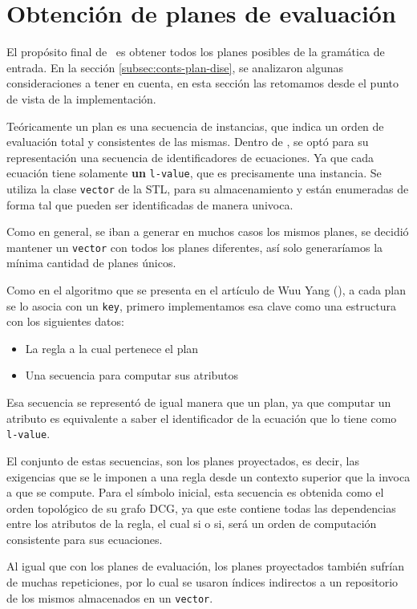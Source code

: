 \section{Obtención de planes de evaluación}
\label{sec:obtplaneval}

El propósito final de \maggen\ es obtener todos los planes posibles de la gramática de entrada. En la sección \ref{subsec:conts-plan-dise}, se analizaron algunas consideraciones a tener en cuenta, en esta sección las retomamos desde el punto de vista de la implementación. 

Teóricamente un plan es una secuencia de instancias, que indica un orden de evaluación total y consistentes de las mismas. Dentro de \maggen, se optó para su representación una secuencia de identificadores de ecuaciones. Ya que cada ecuación tiene solamente \textbf{un} \texttt{l-value}, que es precisamente una instancia. Se utiliza la clase \texttt{vector} de la STL, para su almacenamiento y están enumeradas de forma tal que pueden ser identificadas de manera univoca.

Como en general, se iban a generar en muchos casos los mismos planes, se decidió mantener un \texttt{vector} con todos los planes diferentes, así solo generaríamos la mínima cantidad de planes únicos.

Como en el algoritmo que se presenta en el artículo de Wuu Yang (\cite{wuu-yang1}), a cada plan se lo asocia con un \texttt{key}, primero implementamos esa clave como una estructura con los siguientes datos:
\begin{itemize}
\item La regla a la cual pertenece el plan
\item Una secuencia para computar sus atributos
\end{itemize}

Esa secuencia se representó de igual manera que un plan, ya que computar un atributo es equivalente a saber el identificador de la ecuación que lo tiene como \texttt{l-value}.

El conjunto de estas secuencias, son los planes proyectados, es decir, las exigencias que se le imponen a una regla desde un contexto superior que la invoca a que se compute. Para el símbolo inicial, esta secuencia es obtenida como el orden topológico de su grafo DCG, ya que este contiene todas las dependencias entre los atributos de la regla, el cual si o si, será un orden de computación consistente para sus ecuaciones.

Al igual que con los planes de evaluación, los planes proyectados también sufrían de muchas repeticiones, por lo cual se usaron índices indirectos a un repositorio de los mismos almacenados en un \texttt{vector}.

